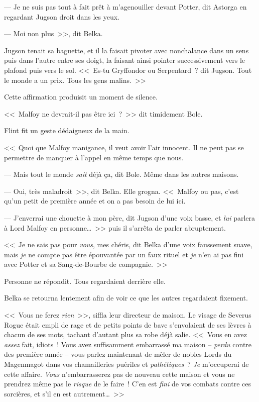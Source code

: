 --- Je ne suis pas tout à fait prêt à m'agenouiller devant Potter, dit Astorga en regardant Jugson droit dans les yeux.

--- Moi non plus~>>, dit Belka.

Jugson tenait sa baguette, et il la faisait pivoter avec nonchalance dans un sens puis dans l'autre entre ses doigt, la faisant ainsi pointer successivement vers le plafond puis vers le sol. <<~Es-tu Gryffondor ou Serpentard~? dit Jugson. Tout le monde a un prix. Tous les gens malins.~>>

Cette affirmation produisit un moment de silence.

<<~Malfoy ne devrait-il pas être ici~?~>> dit timidement Bole.

Flint fit un geste dédaigneux de la main.

<<~Quoi que Malfoy manigance, il veut avoir l'air innocent. Il ne peut pas se permettre de manquer à l'appel en même temps que nous.

--- Mais tout le monde \emph{sait} déjà ça, dit Bole. Même dans les autres maisons.

--- Oui, très maladroit~>>, dit Belka. Elle grogna. <<~Malfoy ou pas, c'est qu'un petit de première année et on a pas besoin de lui ici.

--- J'enverrai une chouette à mon père, dit Jugson d'une voix basse, et \emph{lui} parlera à Lord Malfoy en personne…~>> puis il s'arrêta de parler abruptement.

<<~Je ne sais pas pour \emph{vous}, mes chéris, dit Belka d'une voix faussement suave, mais \emph{je} ne compte pas être épouvantée par un faux rituel et \emph{je} n'en ai pas fini avec Potter et sa Sang-de-Bourbe de compagnie.~>>

Personne ne répondit. Tous regardaient derrière elle.

Belka se retourna lentement afin de voir ce que les autres regardaient fixement.

<<~Vous ne ferez \emph{rien}~>>, siffla leur directeur de maison. Le visage de Severus Rogue était empli de rage et de petits points de bave s'envolaient de ses lèvres à chacun de ses mots, tachant d'autant plus sa robe déjà salie. <<~Vous en avez \emph{assez} fait, idiots~! Vous avez suffisamment embarrassé ma maison -- \emph{perdu} contre des première année -- vous parlez maintenant de mêler de nobles Lords du Magenmagot dans vos chamailleries puériles et \emph{pathétiques}~? \emph{Je} m'occuperai de cette affaire. \emph{Vous} n'embarrasserez pas de nouveau cette maison et vous ne prendrez même pas le \emph{risque} de le faire~! C'en est \emph{fini} de vos combats contre ces sorcières, et s'il en est autrement…~>>

